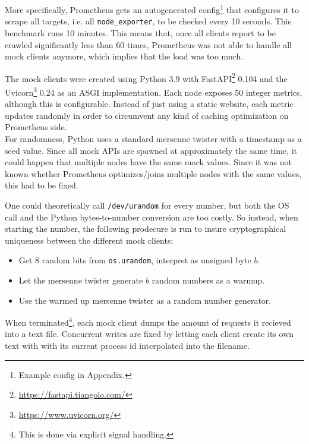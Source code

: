 More specifically, Prometheus gets an autogenerated config\footnote{Example config in Appendix.} that configures it to scrape all targets, i.e. all \texttt{node\_exporter}, to be checked every 10 seconds. This benchmark runs 10 minutes. This means that, once all clients report to be crawled significantly less than 60 times, Prometheus was not able to handle all mock clients anymore, which implies that the load was too much.

The mock clients were created using Python 3.9 with FastAPI\footnote{\url{https://fastapi.tiangolo.com/}} 0.104 and the Uvicorn\footnote{\url{https://www.uvicorn.org/}} 0.24 as an \ac{ASGI} implementation. Each node exposes 50 integer metrics, although this is configurable. Instead of just using a static website, each metric updates randomly in order to circumvent any kind of caching optimization on Prometheus side.\\

For randomness, Python uses a standard mersenne twister with a timestamp as a seed value. Since all mock APIs are spawned at approximately the same time, it could happen that multiple nodes have the same mock values. Since it was not known whether Prometheus optimizes/joins multiple nodes with the same values, this had to be fixed.

One could theoretically call \texttt{/dev/urandom} for every number, but both the OS call and the Python bytes-to-number conversion are too costly. So instead, when starting the number, the following prodecure is run to insure cryptographical uniqueness between the different mock clients:
\begin{itemize}
  \item Get 8 random bits from \texttt{os.urandom}, interpret as unsigned byte $b$.
  \item Let the mersenne twister generate $b$ random numbers as a warmup.
  \item Use the warmed up mersenne twister as a random number generator.
\end{itemize}

When terminated\footnote{This is done via explicit signal handling.}, each mock client dumps the amount of requests it recieved into a text file. Concurrent writes are fixed by letting each client create its own text with with its current process id interpolated into the filename.\\

